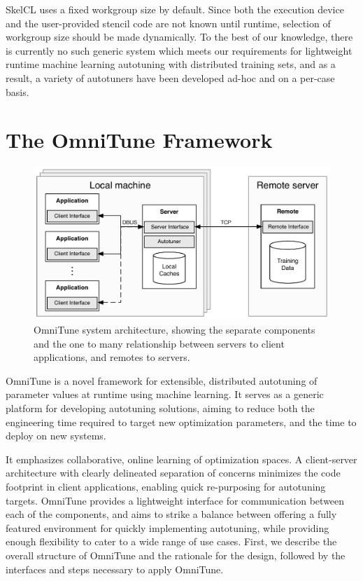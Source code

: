 SkelCL uses a fixed workgroup size by default. Since both the
execution device and the user-provided stencil code are not known
until runtime, selection of workgroup size should be made
dynamically. To the best of our knowledge, there is currently no such
generic system which meets our requirements for lightweight runtime
machine learning autotuning with distributed training sets, and as a
result, a variety of autotuners have been developed ad-hoc and on a
per-case basis.


\section{The OmniTune Framework}\label{sec:autotune}

\begin{figure}
\centering
\includegraphics[width=.6\columnwidth]{img/omnitune-system-overview.pdf}
\caption{%
  OmniTune system architecture, showing the separate components and
  the one to many relationship between servers to client applications,
  and remotes to servers.%
}
\label{fig:omnitune-system-overview}
\end{figure}

OmniTune is a novel framework for extensible, distributed autotuning
of parameter values at runtime using machine learning. It serves as a
generic platform for developing autotuning solutions, aiming to reduce
both the engineering time required to target new optimization
parameters, and the time to deploy on new systems.

It emphasizes collaborative, online learning of optimization spaces. A
client-server architecture with clearly delineated separation of
concerns minimizes the code footprint in client applications, enabling
quick re-purposing for autotuning targets. OmniTune provides a
lightweight interface for communication between each of the
components, and aims to strike a balance between offering a fully
featured environment for quickly implementing autotuning, while
providing enough flexibility to cater to a wide range of use
cases. First, we describe the overall structure of OmniTune and the
rationale for the design, followed by the interfaces and steps
necessary to apply OmniTune.


